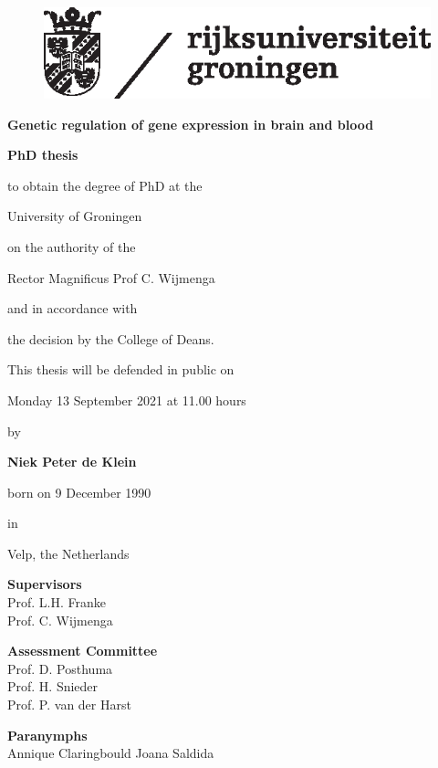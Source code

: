 
\begin{figure}[H]
	\includegraphics{img/rugr_logonl_zwart_cmyk.eps}
\end{figure}


\huge \textbf{Genetic regulation of gene expression in brain and blood}
\large
\vspace{2.5cm}
\\
\centerline{\textbf{ PhD thesis}}
\normalsize
\vspace{0.5cm}

\centerline{to obtain the degree of PhD at the}
\centerline{University of Groningen}
\centerline{on the authority of the}
\centerline{Rector Magnificus Prof C. Wijmenga}
\centerline{and in accordance with}
\centerline{the decision by the College of Deans.}
\vspace{0.2cm}
\centerline{This thesis will be defended in public on}
\vspace{0.2cm}
\centerline{Monday 13 September 2021 at 11.00 hours }
\vspace{0.5cm}
\centerline{by}
\vspace{0.5cm}
\centerline{\textbf{Niek Peter de Klein}}
\centerline{born on 9 December 1990}
\centerline{in}
\centerline{Velp, the Netherlands}

\newpage
\textbf{Supervisors} \\
Prof. L.H. Franke \\
Prof. C. Wijmenga

\textbf{Assessment Committee} \\
Prof. D. Posthuma \\
Prof. H. Snieder
\\
Prof. P. van der Harst

\newpage
\textbf{Paranymphs} \\
Annique Claringbould
Joana Saldida

\clearpage
